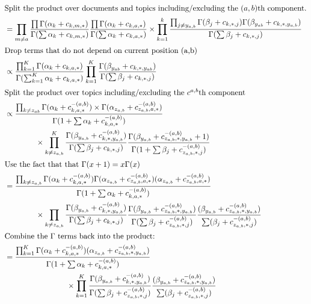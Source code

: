 \documentclass{article}%
\theoremstyle{definition}
\begin{document}
\begin{align}
    \intertext{Split the product over documents and topics including/excluding the $(a,b)$th component.}
        &= \prod_{m \neq a}^{}\frac{\prod \Gamma(\alpha_k + c_{k,m,*})}{\Gamma(\sum \alpha_k + c_{k,m,*})}\frac{\prod \Gamma(\alpha_k + c_{k,a,*})}{\Gamma(\sum \alpha_k + c_{k,a,*})} \times \prod_{k=1}^k \frac{\prod_{j\neq y_{a,b}}^{}\Gamma(\beta_j + c_{k,*,j}) \Gamma(\beta_{y_{ab}} + c_{k,*,y_{a,b}})}{\Gamma(\sum \beta_j + c_{k,*,j}) } \\
    \intertext{Drop terms that do not depend on current position (a,b)}
        &\propto \frac{\prod_{k=1}^{K}\Gamma(\alpha_k + c_{k,a,*})}{\Gamma(\sum_{k=1}^{K}\alpha_k + c_{k,a,*})} \prod_{k=1}^{K}\frac{\Gamma(\beta_{y_{ab}}+ c_{k,*,y_{ab}})}{\Gamma(\sum \beta_j + c_{k,*,j})} \\
    \intertext{Split the product over topics including/excluding the $c^{a,b}$th component}
        &\propto \frac{\prod_{k \neq z_{ab}}^{} \Gamma(\alpha_k + c_{k,a,*}^{-(a,b)}) \times \Gamma(\alpha_{z_{a,b}}+ c_{z_{a,b},a,*}^{-(a,b)})}{\Gamma(1+ \sum \alpha_k + c_{k,a,*}^{-(a,b)})} \\
        \nonumber &\qquad \qquad \times \prod_{k\neq z_{a,b}}^{K}\frac{\Gamma(\beta_{y_{a,b}}+ c_{k,*,y_{a,b}}^{-(a,b)})}{\Gamma(\sum \beta_j + c_{k,*,j})} \frac{\Gamma(\beta_{y_{a,b}}+c_{z_{a,b},*,y_{a,b}}^{-(a,b)}+1)}{\Gamma(1+\sum \beta_j + c_{z_{a,b},*,j}^{-(a,b)})} \\
    \intertext{Use the fact that that $\Gamma(x+1) = x\Gamma(x)$}
        &= \frac{\prod_{k \neq z_{a,b}}^{} \Gamma(\alpha_k + c_{k,a,*}^{-(a,b)})\Gamma(\alpha_{z_{a,b}}+c_{z_{a,b},a,*}^{-(a,b)})(\alpha_{z_{a,b}}+c_{z_{a,b},a,*}^{-(a,b)})}{\Gamma(1+\sum \alpha_k + c_{k,a,*}^{-(a,b)})} \\
        \nonumber &\qquad \qquad \times \prod_{k\neq z_{a,b}}^{} \frac{\Gamma(\beta_{y_{a,b}}+c_{k,*,y_{a,b}}^{-(a,b)})}{\Gamma(\sum \beta_j + c_{k,*,j})} \frac{\Gamma(\beta_{y_{a,b}}+c_{z_{a,b},*,y_{a,b}}^{-(a,b)})}{\Gamma(\sum \beta_j + c_{z_{a,b},*,j}^{-(a,b)})} \frac{(\beta_{y_{a,b}}+c_{z_{a,b},*,y_{a,b}}^{-(a,b)})}{\sum (\beta_j + c_{z_{a,b},*,j}^{-(a,b)})} \\
    \intertext{Combine the $\Gamma$ terms back into the product:}
        &= \frac{\prod_{k=1}^{K}\Gamma(\alpha_k + c_{k,a,*}^{-(a,b)})(\alpha_{z_{a,b}}+c_{z_{a,b},*,y_{a,b}}^{-(a,b)})}{\Gamma(1+\sum \alpha_k + c_{k,a,*}^{-(a,b)})} \\
        \nonumber &\qquad \qquad \qquad \qquad \times \prod_{k=1}^{K}\frac{\Gamma(\beta_{y_{a,b}}+c_{k,*,y_{a,b}}^{-(a,b)})}{\Gamma(\sum \beta_j + c_{z_{a,b},*,j}^{-(a,b)})}\frac{(\beta_{y_{a,b}}+ c_{z_{a,b},*,y_{a,b}}^{-(a,b)})}{\sum(\beta_j + c_{z_{a,b},*,j}^{-(a,b)})} \\

\end{align}
\end{document}

